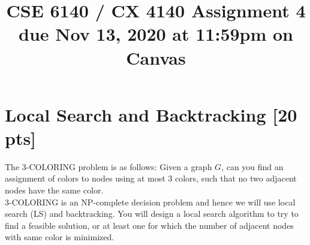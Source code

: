 \documentclass{article}
\title{CSE 6140 / CX 4140 Assignment 4\\due Nov 13, 2020 at 11:59pm on Canvas }
\author{}
\date{}
\begin{document}
\maketitle


\section{Local Search and Backtracking [20 pts]}

The 3-COLORING problem is as follows: Given a graph $G$, can you find an assignment of colors to nodes
using at most 3 colors, such that no two adjacent nodes have the same color.\\ 3-COLORING is an NP-complete decision problem and hence we will use local search (LS) and backtracking.
You will design a local search algorithm to try to find a feasible solution, or at least one for which the number of adjacent nodes with same color is minimized. 
\end{document}

